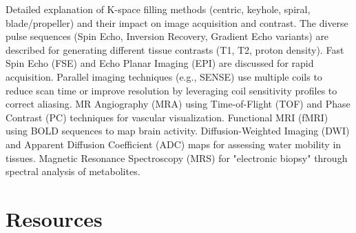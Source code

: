 Detailed explanation of K-space filling methods (centric, keyhole, spiral, blade/propeller) and their impact on image acquisition and contrast. The diverse pulse sequences (Spin Echo, Inversion Recovery, Gradient Echo variants) are described for generating different tissue contrasts (T1, T2, proton density). Fast Spin Echo (FSE) and Echo Planar Imaging (EPI) are discussed for rapid acquisition. Parallel imaging techniques (e.g., SENSE) use multiple coils to reduce scan time or improve resolution by leveraging coil sensitivity profiles to correct aliasing. MR Angiography (MRA) using Time-of-Flight (TOF) and Phase Contrast (PC) techniques for vascular visualization. Functional MRI (fMRI) using BOLD sequences to map brain activity. Diffusion-Weighted Imaging (DWI) and Apparent Diffusion Coefficient (ADC) maps for assessing water mobility in tissues. Magnetic Resonance Spectroscopy (MRS) for "electronic biopsy" through spectral analysis of metabolites.

\section{Resources}


